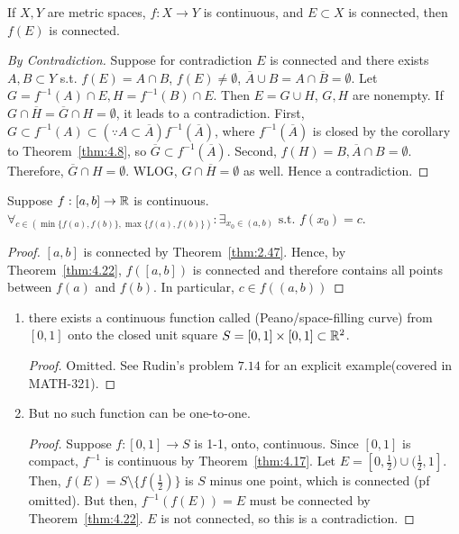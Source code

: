 \begin{theorem}[22]
	If $X,Y$ are metric spaces, $f:X\to Y$ is continuous, and $E \subset X$ is connected, then $f(E)$ is connected.
	\begin{proof}[By Contradiction]
		Suppose for contradiction $E$ is connected and there exists $A,B \subset Y$ s.t. $f(E)=A \cap  B$, $f(E) \neq \emptyset$, $\overline{A} \cup B=A \cap \overline{B}=\emptyset$.
		Let $G=f^{-1}(A) \cap E, H=f^{-1}(B)\cap E$. Then $E=G \cup H$, $G,H$ are nonempty.
		If $G \cap \overline{H}=\overline{G} \cap H=\emptyset$, it leads to a contradiction.
		First, $G \subset f^{-1}(A) \subset(\because A \subset \overline{A}) f^{-1}(\overline{A})$, where $f^{-1}(\overline{A})$ is closed by the corollary to Theorem~\ref{thm:4.8}, so $\overline{G} \subset f^{-1}(\overline{A})$.
		Second, $f(H)=B, \overline{A} \cap B=\emptyset$.
		Therefore, $\overline{G} \cap H =\emptyset$.
		WLOG, $G \cap \overline{H} = \emptyset$ as well.
		Hence a contradiction.
	\end{proof}
\end{theorem}

\begin{theorem}
	Suppose $f: [a,b]\to \mathbb{R}$ is continuous.  $\forall_{c \in (\min\{f(a),f(b)\}, \max\{f(a),f(b)\})}: \exists_{x_0 \in (a,b)} \text{ s.t. } f(x_0)=c$.
	\begin{proof}
		$[a,b]$ is connected by Theorem~\ref{thm:2.47}. Hence, by Theorem~\ref{thm:4.22}, $f([a,b])$ is connected and therefore contains all points between $f(a)$ and $f(b)$. In particular, $c \in f((a,b))$
	\end{proof}
\end{theorem}

\begin{example}
	\begin{enumerate}
		\item there exists a continuous function called (Peano/space-filling curve) from $[0,1]$ onto the closed unit square $S=[0,1]\times [0,1] \subset \mathbb{R}^2$.
		      \begin{proof}
			      Omitted. See Rudin's problem $7.14$ for an explicit example(covered in MATH-321).
		      \end{proof}
		\item But no such function can be one-to-one.
		      \begin{proof}
			      Suppose $f:[0,1]\to S$ is 1-1, onto, continuous. Since $[0,1]$ is compact, $f^{-1}$ is continuous by Theorem~\ref{thm:4.17}.
			      Let $E=[0,\frac{1}{2})\cup (\frac{1}{2},1]$. Then, $f(E)=S\setminus \{f(\frac{1}{2})\}$ is $S$ minus one point, which is connected (pf omitted).
			      But then, $f^{-1}(f(E))=E$ must be connected by Theorem~\ref{thm:4.22}. $E$ is not connected, so this is a contradiction.
		      \end{proof}
	\end{enumerate}
\end{example}



